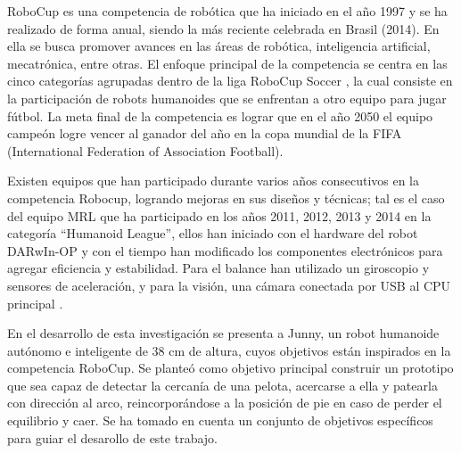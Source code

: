 RoboCup \cite{robotcup} es una competencia de robótica que ha iniciado en el año 1997 y se ha realizado de forma anual, siendo la más reciente celebrada en Brasil (2014). En ella se busca promover avances en las áreas de robótica, inteligencia artificial, mecatrónica, entre otras. El enfoque principal de la competencia se centra en las cinco categorías agrupadas dentro de la liga RoboCup Soccer \cite{robotcupsoccer}, la cual consiste en la participación de robots humanoides que se enfrentan a otro equipo para jugar fútbol. La meta final de la competencia es lograr que en el año 2050 el equipo campeón logre vencer al ganador del año en la copa mundial de la FIFA (International Federation of Association Football).

Existen equipos que han participado durante varios años consecutivos en la competencia Robocup, logrando mejoras en sus diseños y técnicas; tal es el caso del equipo MRL que ha participado en los años 2011, 2012, 2013 y 2014 en la categoría “Humanoid League”, ellos han iniciado con el hardware del robot DARwIn-OP y con el tiempo han modificado los componentes electrónicos para agregar eficiencia y estabilidad. Para el balance han utilizado un giroscopio y sensores de aceleración, y para la visión, una cámara conectada por USB al CPU principal \cite{paper1}.

 

En el desarrollo de esta investigaci\'on se presenta a Junny, un robot humanoide aut\'onomo e inteligente de 38 cm de altura, cuyos objetivos están inspirados en la competencia RoboCup. Se planteó como objetivo principal construir un prototipo que sea capaz de detectar la cercanía de una pelota, acercarse a ella y patearla con direcci\'on al arco, reincorpor\'andose a la posici\'on de pie en caso de perder el equilibrio y caer. Se ha tomado en cuenta un conjunto de objetivos específicos para guiar el desarollo de este trabajo. %


